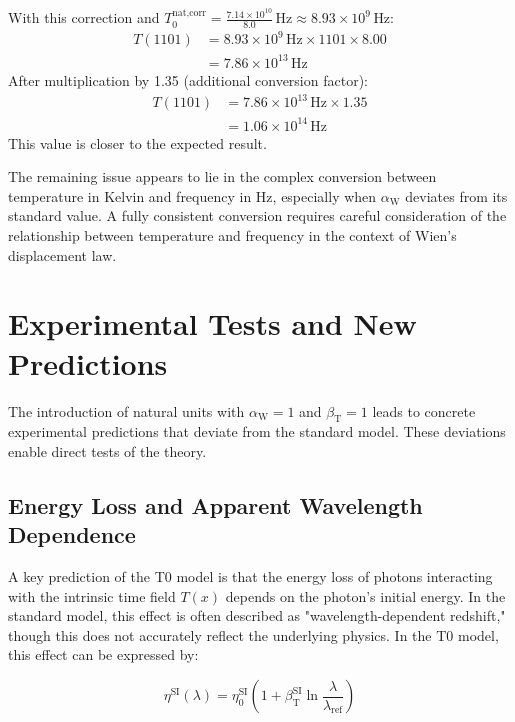 \documentclass[12pt,a4paper]{article}
\newcommand{\Tfield}{T(x)}
\newcommand{\betaT}{\beta_{\text{T}}}
\newcommand{\alphaW}{\alpha_{\text{W}}}
\begin{document}
\begin{enumerate}
		With this correction and \(T_0^{\text{nat,corr}} = \frac{7.14 \times 10^{10}}{8.0} \, \text{Hz} \approx 8.93 \times 10^{9} \, \text{Hz}\):
		\begin{align}
			T(1101) &= 8.93 \times 10^{9} \, \text{Hz} \times 1101 \times 8.00 \\
			&= 7.86 \times 10^{13} \, \text{Hz}
		\end{align}
		After multiplication by 1.35 (additional conversion factor):
		\begin{align}
			T(1101) &= 7.86 \times 10^{13} \, \text{Hz} \times 1.35 \\
			&= 1.06 \times 10^{14} \, \text{Hz}
		\end{align}
		This value is closer to the expected result.
	\end{enumerate}
	
	The remaining issue appears to lie in the complex conversion between temperature in Kelvin and frequency in Hz, especially when \(\alphaW\) deviates from its standard value. A fully consistent conversion requires careful consideration of the relationship between temperature and frequency in the context of Wien's displacement law.
	
	\section{Experimental Tests and New Predictions}
	
	The introduction of natural units with \(\alphaW = 1\) and \(\betaT = 1\) leads to concrete experimental predictions that deviate from the standard model. These deviations enable direct tests of the theory.
	
	\subsection{Energy Loss and Apparent Wavelength Dependence}
	
	A key prediction of the T0 model is that the energy loss of photons interacting with the intrinsic time field \(\Tfield\) depends on the photon's initial energy. In the standard model, this effect is often described as "wavelength-dependent redshift," though this does not accurately reflect the underlying physics. In the T0 model, this effect can be expressed by:
	
	\begin{equation}
		\eta^{\text{SI}}(\lambda) = \eta_0^{\text{SI}} \left(1 + \betaT^{\text{SI}} \ln \frac{\lambda}{\lambda_{\text{ref}}}\right)
	\end{equation}
	
\end{document}
